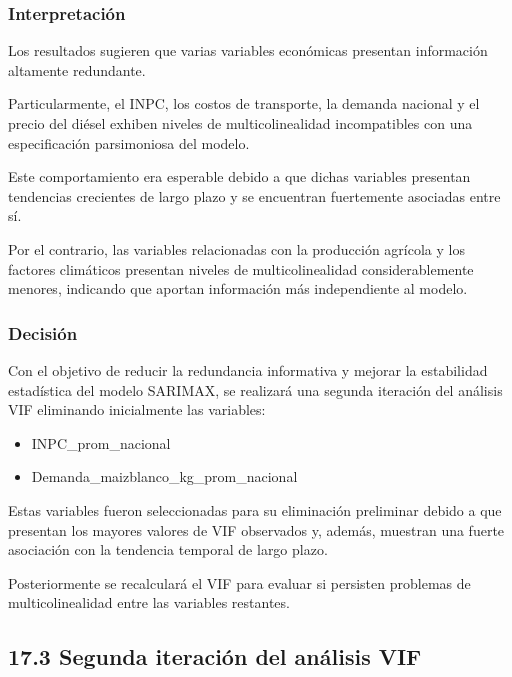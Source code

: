 \documentclass[11pt]{article}
\providecommand{\tightlist}{%
      \setlength{\itemsep}{0pt}\setlength{\parskip}{0pt}}
\begin{document}
    \hypertarget{interpretaciuxf3n}{%
\subsubsection{Interpretación}\label{interpretaciuxf3n}}

Los resultados sugieren que varias variables económicas presentan
información altamente redundante.

Particularmente, el INPC, los costos de transporte, la demanda nacional
y el precio del diésel exhiben niveles de multicolinealidad
incompatibles con una especificación parsimoniosa del modelo.

Este comportamiento era esperable debido a que dichas variables
presentan tendencias crecientes de largo plazo y se encuentran
fuertemente asociadas entre sí.

Por el contrario, las variables relacionadas con la producción agrícola
y los factores climáticos presentan niveles de multicolinealidad
considerablemente menores, indicando que aportan información más
independiente al modelo.

\hypertarget{decisiuxf3n}{%
\subsubsection{Decisión}\label{decisiuxf3n}}

Con el objetivo de reducir la redundancia informativa y mejorar la
estabilidad estadística del modelo SARIMAX, se realizará una segunda
iteración del análisis VIF eliminando inicialmente las variables:

\begin{itemize}
\tightlist
\item
  INPC\_prom\_nacional
\item
  Demanda\_maizblanco\_kg\_prom\_nacional
\end{itemize}

Estas variables fueron seleccionadas para su eliminación preliminar
debido a que presentan los mayores valores de VIF observados y, además,
muestran una fuerte asociación con la tendencia temporal de largo plazo.

Posteriormente se recalculará el VIF para evaluar si persisten problemas
de multicolinealidad entre las variables restantes.

    \hypertarget{segunda-iteraciuxf3n-del-anuxe1lisis-vif}{%
\subsection{17.3 Segunda iteración del análisis
VIF}\label{segunda-iteraciuxf3n-del-anuxe1lisis-vif}}
\end{document}
